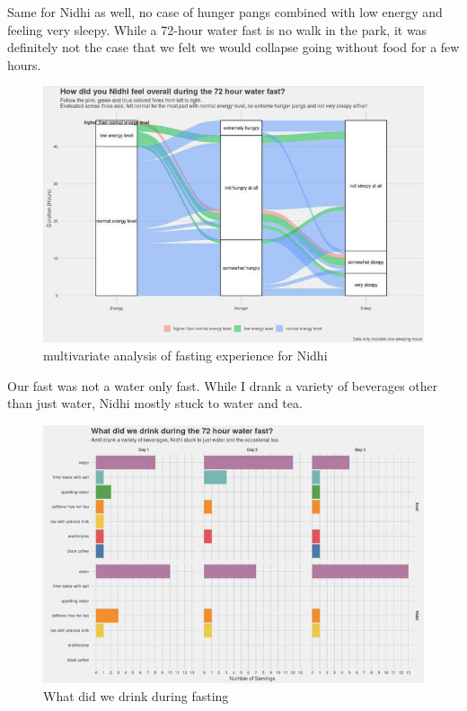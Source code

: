 \documentclass[
  oneside]{book}
\begin{document}
Same for Nidhi as well, no case of hunger pangs combined with low energy and feeling very sleepy. While a 72-hour water fast is no walk in the park, it was definitely not the case that we felt we would collapse going without food for a few hours.

\begin{figure}
\centering
\includegraphics{pictures/fasting3.jpeg}
\caption{multivariate analysis of fasting experience for Nidhi}
\end{figure}

Our fast was not a water only fast. While I drank a variety of beverages other than just water, Nidhi mostly stuck to water and tea.

\begin{figure}
\centering
\includegraphics{pictures/fasting4.jpeg}
\caption{What did we drink during fasting}
\end{figure}
\end{document}
